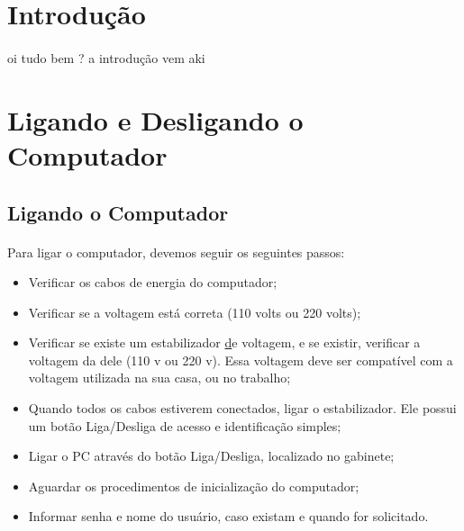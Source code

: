 \documentclass[12pt]{article}
\begin{document}
\pagestyle{fancy}
	
\tableofcontents
{\let\thefootnote\relax{}}

{\let\thefootnote\relax{}}

\newpage

\section{Introdução}
\paragraph{} oi tudo bem  ? a introdução vem aki 

\section{Ligando e Desligando o Computador}
\subsection{Ligando o Computador} 

\paragraph{} Para ligar o computador, devemos seguir os seguintes passos: \\
\begin{itemize}
	
	\item Verificar os cabos de energia do computador;
	
	\item Verificar se a voltagem está correta (110 volts ou 220 volts);
	
	\item Verificar se existe um estabilizador \href{Fig:estabilizador} de voltagem, e se existir, verificar a voltagem da 
	dele (110 v ou 220 v). Essa voltagem deve ser compatível com a voltagem utilizada na sua casa, ou no trabalho;
	
	\item Quando todos os cabos estiverem conectados, ligar o estabilizador. Ele possui um botão Liga/Desliga de acesso e identificação simples;

	\item Ligar o PC através do botão Liga/Desliga, localizado no gabinete;
	
	\item Aguardar os procedimentos de inicialização do computador; 
	
	\item Informar senha e nome do usuário, caso existam e quando for solicitado.


\end{itemize}
\end{document}
